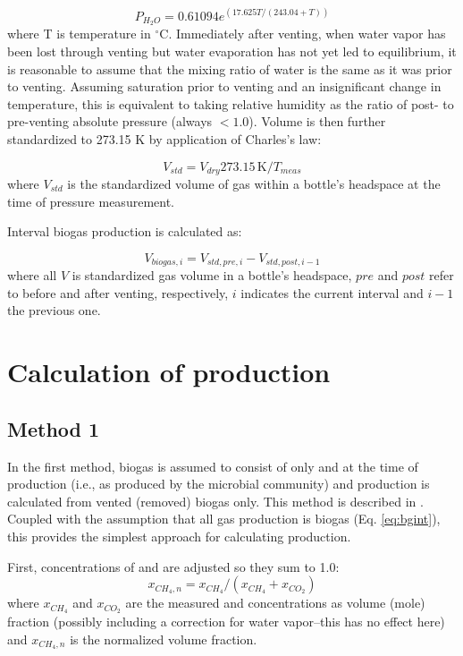 \documentclass[]{article}
\newcommand{\unit}[1]{\ensuremath{\, \mathrm{#1}}}
\begin{document}
\begin{equation}
\label{eq:magnus}
   P_{H_2O} = 0.61094 e^{(17.625 T/(243.04 + T))}
\end{equation}
where T is temperature in $^\circ$C.
Immediately after venting, when water vapor has been lost through venting but water evaporation has not yet led to equilibrium, it is reasonable to assume that the mixing ratio of water is the same as it was prior to venting.
Assuming saturation prior to venting and an insignificant change in temperature, this is equivalent to taking relative humidity as the ratio of post- to pre-venting absolute pressure (always $<1.0$). 
Volume is then further standardized to 273.15 K by application of Charles's law:

\begin{equation}
  \label{eq:bgstd}
  V_{std} = V_{dry} 273.15 \unit{K}/T_{meas}
\end{equation}
where $V_{std}$ is the standardized volume of gas within a bottle's headspace at the time of pressure measurement.

Interval biogas production is calculated as:

\begin{equation}
  \label{eq:bgint}
  V_{biogas, i} = V_{std, pre, i} - V_{std, post, i - 1}
\end{equation}
where all $V$ is standardized gas volume in a bottle's headspace, $pre$ and $post$ refer to before and after venting, respectively, $i$ indicates the current interval and $i-1$ the previous one.

\section{Calculation of  production}
\subsection{Method 1}
In the first method, biogas is assumed to consist of only  and  at the time of production (i.e., as produced by the microbial community) and  production is calculated from vented (removed) biogas only.
This method is described in \cite{brian1991}.
Coupled with the assumption that all gas production is biogas (Eq. \ref{eq:bgint}), this provides the simplest approach for calculating  production.

First, concentrations of  and  are adjusted so they sum to 1.0:
\begin{equation}
  x_{CH_4, n} = x_{CH_4}/(x_{CH_4} + x_{CO_2})
\end{equation}
where $x_{CH_4}$ and $x_{CO_2}$ are the measured  and  concentrations as volume (mole) fraction (possibly including a correction for water vapor--this has no effect here) and $x_{CH_4, n}$ is the normalized  volume fraction.
\end{document}
